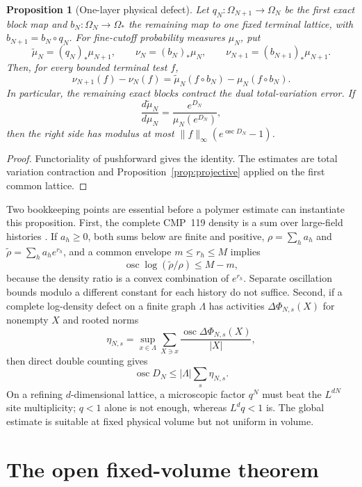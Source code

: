 \documentclass[11pt]{article}
\newtheorem{proposition}[theorem]{Proposition}
\theoremstyle{definition}
\theoremstyle{remark}
\begin{document}
\begin{proposition}[One-layer physical defect]\label{prop:onelayer}
Let $q_N:\Omega_{N+1}\to\Omega_N$ be the first exact block map and
$b_N:\Omega_N\to\Omega_*$ the remaining map to one fixed terminal lattice, with
$b_{N+1}=b_N\circ q_N$.  For fine-cutoff probability measures $\mu_N$, put
\[
 \widetilde\mu_N=(q_N)_*\mu_{N+1},\qquad
 \nu_N=(b_N)_*\mu_N,\qquad
 \nu_{N+1}=(b_{N+1})_*\mu_{N+1}.
\]
Then, for every bounded terminal test $f$,
\[
 \nu_{N+1}(f)-\nu_N(f)
 =\widetilde\mu_N(f\circ b_N)-\mu_N(f\circ b_N).
\]
In particular, the remaining exact blocks contract the dual total-variation
error.  If
\[
 \frac{d\widetilde\mu_N}{d\mu_N}
 =\frac{e^{D_N}}{\mu_N(e^{D_N})},
\]
then the right side has modulus at most
$\lVert f\rVert_\infty(e^{\operatorname{osc}D_N}-1)$.
\end{proposition}

\begin{proof}
Functoriality of pushforward gives the identity.  The estimates are total
variation contraction and Proposition~\ref{prop:projective} applied on the first
common lattice.
\end{proof}

Two bookkeeping points are essential before a polymer estimate can instantiate
this proposition.  First, the complete CMP~119 density is a sum over large-field
histories \cite[Eq.~(2.18)]{Balaban1988Convergent}.  If $a_h\ge0$, both sums
below are finite and positive,
$\rho=\sum_h a_h$ and $\widetilde\rho=\sum_h a_he^{r_h}$, and a common envelope
$m\le r_h\le M$ implies
\[
 \operatorname{osc}\log(\widetilde\rho/\rho)\le M-m,
\]
because the density ratio is a convex combination of $e^{r_h}$.  Separate
oscillation bounds modulo a different constant for each history do not suffice.
Second, if a complete log-density defect on a finite graph $\Lambda$ has
activities $\Delta\Phi_{N,s}(X)$ for nonempty $X$ and rooted norms
\[
 \eta_{N,s}=\sup_{x\in\Lambda}\sum_{X\ni x}
 \frac{\operatorname{osc}\Delta\Phi_{N,s}(X)}{|X|},
\]
then direct double counting gives
\[
 \operatorname{osc}D_N\le |\Lambda|\sum_s\eta_{N,s}.
\]
On a refining $d$-dimensional lattice, a microscopic factor $q^N$ must beat the
$L^{dN}$ site multiplicity; $q<1$ alone is not enough, whereas $L^dq<1$ is.  The
global estimate is suitable at fixed physical volume but not uniform in volume.

\section{The open fixed-volume theorem}
\end{document}
